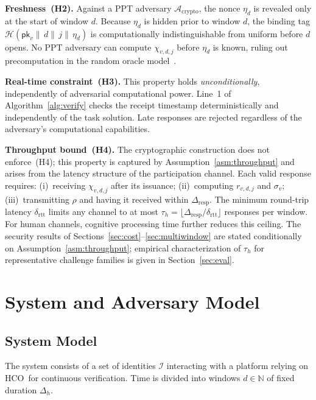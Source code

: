 \documentclass[11pt]{article}
\newcommand{\HCO}{HCO\xspace}
\theoremstyle{remark}
\theoremstyle{plain}
\begin{document}
	\noindent\textbf{Freshness~(H2).}
	Against a PPT adversary $\mathcal{A}_{\mathrm{crypto}}$, the nonce
	$\eta_d$ is revealed only at the start of window $d$. Because $\eta_d$
	is hidden prior to window $d$, the binding tag
	$\mathcal{H}(\mathsf{pk}_v \|\, d \|\, j \|\, \eta_d)$ is
	computationally indistinguishable from uniform before $d$ opens.
	No PPT adversary can compute $\chi_{v,d,j}$ before $\eta_d$ is
	known, ruling out precomputation in the random oracle
	model~\cite{bellare1993random}.
	
	\noindent\textbf{Real-time constraint~(H3).}
	This property holds \emph{unconditionally}, independently of
	adversarial computational power. Line~1 of
	Algorithm~\ref{alg:verify} checks the receipt timestamp
	deterministically and independently of the task solution.
	Late responses are rejected regardless of the adversary's
	computational capabilities.
	
	\noindent\textbf{Throughput bound~(H4).}
	The cryptographic construction does not enforce~(H4); this property
	is captured by Assumption~\ref{asm:throughput} and arises from the
	latency structure of the participation channel. Each valid response
	requires: (i)~receiving $\chi_{v,d,j}$ after its issuance;
	(ii)~computing $r_{v,d,j}$ and $\sigma_v$; (iii)~transmitting $\rho$
	and having it received within $\Delta_{\mathrm{resp}}$. The minimum
	round-trip latency $\delta_{\mathrm{rtt}}$ limits any channel to at most
	$\tau_h = \lfloor\Delta_{\mathrm{resp}}/\delta_{\mathrm{rtt}}\rfloor$
	responses per window. For human channels, cognitive processing time
	further reduces this ceiling. The security results of
	Sections~\ref{sec:cost}--\ref{sec:multiwindow} are stated conditionally
	on Assumption~\ref{asm:throughput}; empirical characterization of
	$\tau_h$ for representative challenge families is given in
	Section~\ref{sec:eval}.
	
	
	\section{System and Adversary Model}
	\label{sec:model}
	
	\subsection{System Model}
	
	The system consists of a set of identities $\mathcal{I}$ interacting with
	a platform relying on \HCO\ for continuous verification. Time is divided
	into windows $d \in \mathbb{N}$ of fixed duration $\Delta_h$.
	
\end{document}
